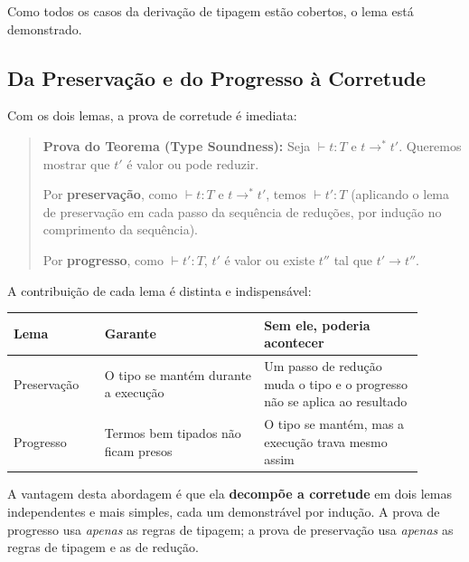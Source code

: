 Como todos os casos da derivação de tipagem estão cobertos, o lema
está demonstrado.

\subsection{Da Preservação e do Progresso à Corretude}

Com os dois lemas, a prova de corretude é imediata:

\begin{quote}
  \textbf{Prova do Teorema (Type Soundness):} Seja \(\vdash t : T\) e
  \(t \to^* t'\). Queremos mostrar que \(t'\) é valor ou pode reduzir.

  Por \textbf{preservação}, como \(\vdash t : T\) e \(t \to^* t'\),
  temos \(\vdash t' : T\) (aplicando o lema de preservação em cada
  passo da sequência de reduções, por indução no comprimento da sequência).

  Por \textbf{progresso}, como \(\vdash t' : T\), \(t'\) é valor ou
  existe \(t''\) tal que \(t' \to t''\).
\end{quote}

A contribuição de cada lema é distinta e indispensável:

\begin{table}[H]
  \begin{tabular}{
      >{\raggedright\arraybackslash}p{0.20\linewidth}
      >{\raggedright\arraybackslash}p{0.35\linewidth}
      >{\raggedright\arraybackslash}p{0.35\linewidth}
    }
    \toprule
    \textbf{Lema} & \textbf{Garante} & \textbf{Sem ele, poderia acontecer} \\
    \midrule
    Preservação & O tipo se mantém durante a execução & Um passo de
    redução muda o tipo e o progresso não se aplica ao resultado \\
    \addlinespace
    Progresso & Termos bem tipados não ficam presos & O tipo se
    mantém, mas a execução trava mesmo assim \\
    \bottomrule
  \end{tabular}
  \centering
\end{table}

A vantagem desta abordagem é que ela \textbf{decompõe a corretude} em
dois lemas independentes e mais simples, cada um demonstrável por
indução. A prova de progresso usa \emph{apenas} as regras de tipagem;
a prova de preservação usa \emph{apenas} as regras de tipagem e as de redução.

